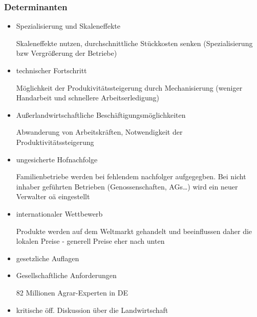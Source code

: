 \documentclass[11pt]{article}
\begin{document}
\subsubsection{Determinanten}
\begin{itemize}
	\item{Spezialisierung und Skaleneffekte}

		Skaleneffekte nutzen, durchschnittliche Stückkosten senken (Spezialisierung bzw Vergrößerung der Betriebe)
	\item{technischer Fortschritt}

		Möglichkeit der Produkivitätssteigerung durch Mechanisierung (weniger Handarbeit und schnellere Arbeitserledigung)
	\item{Außerlandwirtschaftliche Beschäftigungsmöglichkeiten}

		Abwanderung von Arbeitskräften, Notwendigkeit der Produktivitätssteigerung
	\item{ungesicherte Hofnachfolge}

		Familienbetriebe werden bei fehlendem nachfolger aufgegegben. Bei nicht inhaber geführten Betrieben (Genossenschaften, AGs\ldots) wird ein neuer Verwalter oä eingestellt
	\item{internationaler Wettbewerb}

		Produkte werden auf dem Weltmarkt gehandelt und beeinflussen daher die lokalen Preise - generell Preise eher nach unten

	\item{gesetzliche Auflagen}

	\item{Gesellschaftliche Anforderungen}

		82 Millionen Agrar-Experten in DE
	\item{kritische öff. Diskussion über die Landwirtschaft}
\end{itemize}
\end{document}
